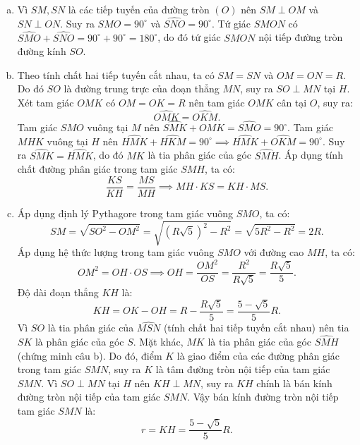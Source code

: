 \begin{bt}
{\begin{center}
\end{center}
\begin{enumerate}[a)]
	\item Vì $SM, SN$ là các tiếp tuyến của đường tròn $(O)$ nên $SM \perp OM$ và $SN \perp ON$.
	Suy ra $\widehat{SMO} = 90^\circ$ và $\widehat{SNO} = 90^\circ$.
	Tứ giác $SMON$ có $\widehat{SMO} + \widehat{SNO} = 90^\circ + 90^\circ = 180^\circ$, do đó tứ giác $SMON$ nội tiếp đường tròn đường kính $SO$.
	\item Theo tính chất hai tiếp tuyến cắt nhau, ta có $SM = SN$ và $OM = ON = R$.
	Do đó $SO$ là đường trung trực của đoạn thẳng $MN$, suy ra $SO \perp MN$ tại $H$.
	Xét tam giác $OMK$ có $OM = OK = R$ nên tam giác $OMK$ cân tại $O$, suy ra:
	$$\widehat{OMK} = \widehat{OKM}.$$
	Tam giác $SMO$ vuông tại $M$ nên $\widehat{SMK} + \widehat{OMK} = \widehat{SMO} = 90^\circ$.
	Tam giác $MHK$ vuông tại $H$ nên $\widehat{HMK} + \widehat{HKM} = 90^\circ \implies \widehat{HMK} + \widehat{OKM} = 90^\circ$.
	Suy ra $\widehat{SMK} = \widehat{HMK}$, do đó $MK$ là tia phân giác của góc $\widehat{SMH}$.
	Áp dụng tính chất đường phân giác trong tam giác $SMH$, ta có:
	$$\dfrac{KS}{KH} = \dfrac{MS}{MH} \implies MH \cdot KS = KH \cdot MS.$$
	\item Áp dụng định lý Pythagore trong tam giác vuông $SMO$, ta có:
	$$SM = \sqrt{SO^2 - OM^2} = \sqrt{(R\sqrt{5})^2 - R^2} = \sqrt{5R^2 - R^2} = 2R.$$
	Áp dụng hệ thức lượng trong tam giác vuông $SMO$ với đường cao $MH$, ta có:
	$$OM^2 = OH \cdot OS \implies OH = \dfrac{OM^2}{OS} = \dfrac{R^2}{R\sqrt{5}} = \dfrac{R\sqrt{5}}{5}.$$
	Độ dài đoạn thẳng $KH$ là:
	$$KH = OK - OH = R - \dfrac{R\sqrt{5}}{5} = \dfrac{5 - \sqrt{5}}{5}R.$$
	Vì $SO$ là tia phân giác của $\widehat{MSN}$ (tính chất hai tiếp tuyến cắt nhau) nên tia $SK$ là phân giác của góc $S$.
	Mặt khác, $MK$ là tia phân giác của góc $\widehat{SMH}$ (chứng minh câu b).
	Do đó, điểm $K$ là giao điểm của các đường phân giác trong tam giác $SMN$, suy ra $K$ là tâm đường tròn nội tiếp của tam giác $SMN$.
	Vì $SO \perp MN$ tại $H$ nên $KH \perp MN$, suy ra $KH$ chính là bán kính đường tròn nội tiếp của tam giác $SMN$.
	Vậy bán kính đường tròn nội tiếp tam giác $SMN$ là:
	$$r = KH = \dfrac{5 - \sqrt{5}}{5}R.$$
\end{enumerate}
}
\end{bt}
